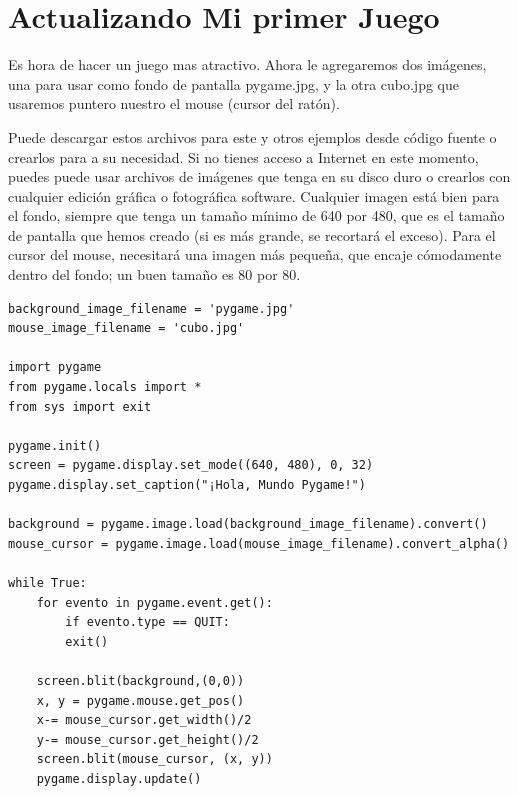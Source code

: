 
\section{Actualizando Mi primer Juego}



Es hora de hacer un juego mas atractivo.  Ahora le agregaremos dos imágenes, una para usar como fondo de pantalla {\ttfamily pygame.jpg},
y la otra {\ttfamily cubo.jpg} que usaremos puntero nuestro el mouse (cursor del ratón).
   
Puede descargar estos archivos para este y otros ejemplos desde código fuente o crearlos para a su necesidad. Si no tienes acceso a Internet en este momento, puedes puede usar archivos de imágenes que tenga en su disco duro o crearlos con cualquier edición gráfica o fotográfica software. Cualquier imagen está bien para el fondo, siempre que tenga un tamaño mínimo de 640 por 480, que es el tamaño de pantalla que hemos creado (si es más grande, se recortará el exceso). Para el cursor del mouse, necesitará una imagen más pequeña, que encaje cómodamente dentro del fondo; un buen tamaño es 80 por 80. 


\hspace{-2.9cm}{\ttfamily \scriptsize mi\_primer}

\vspace{-0.2cm}
\hspace{-2.5cm}{\ttfamily \scriptsize \_pygame.py}\vspace{-0.84cm}
\begin{lstlisting}	
background_image_filename = 'pygame.jpg'
mouse_image_filename = 'cubo.jpg'

import pygame
from pygame.locals import *
from sys import exit

pygame.init()
screen = pygame.display.set_mode((640, 480), 0, 32)
pygame.display.set_caption("¡Hola, Mundo Pygame!")

background = pygame.image.load(background_image_filename).convert()
mouse_cursor = pygame.image.load(mouse_image_filename).convert_alpha()

while True:
	for evento in pygame.event.get():
		if evento.type == QUIT:
		exit()
	
	screen.blit(background,(0,0))
	x, y = pygame.mouse.get_pos()
	x-= mouse_cursor.get_width()/2
	y-= mouse_cursor.get_height()/2
	screen.blit(mouse_cursor, (x, y))
	pygame.display.update()	
\end{lstlisting}




